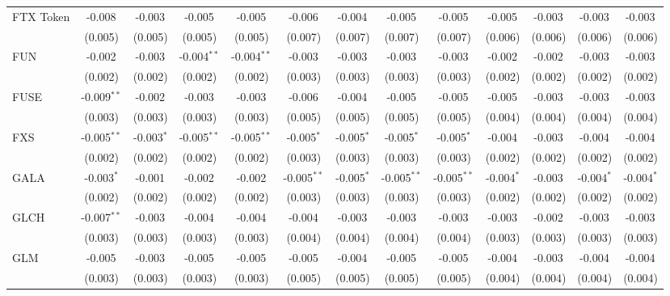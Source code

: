 \begin{table}[!htbp]
\begin{tabular}{@{\extracolsep{5pt}}lcccccccccccc}
 FTX Token & -0.008$^{}$ & -0.003$^{}$ & -0.005$^{}$ & -0.005$^{}$ & -0.006$^{}$ & -0.004$^{}$ & -0.005$^{}$ & -0.005$^{}$ & -0.005$^{}$ & -0.003$^{}$ & -0.003$^{}$ & -0.003$^{}$ \\
  & (0.005) & (0.005) & (0.005) & (0.005) & (0.007) & (0.007) & (0.007) & (0.007) & (0.006) & (0.006) & (0.006) & (0.006) \\
 FUN & -0.002$^{}$ & -0.003$^{}$ & -0.004$^{**}$ & -0.004$^{**}$ & -0.003$^{}$ & -0.003$^{}$ & -0.003$^{}$ & -0.003$^{}$ & -0.002$^{}$ & -0.002$^{}$ & -0.003$^{}$ & -0.003$^{}$ \\
  & (0.002) & (0.002) & (0.002) & (0.002) & (0.003) & (0.003) & (0.003) & (0.003) & (0.002) & (0.002) & (0.002) & (0.002) \\
 FUSE & -0.009$^{**}$ & -0.002$^{}$ & -0.003$^{}$ & -0.003$^{}$ & -0.006$^{}$ & -0.004$^{}$ & -0.005$^{}$ & -0.005$^{}$ & -0.005$^{}$ & -0.003$^{}$ & -0.003$^{}$ & -0.003$^{}$ \\
  & (0.003) & (0.003) & (0.003) & (0.003) & (0.005) & (0.005) & (0.005) & (0.005) & (0.004) & (0.004) & (0.004) & (0.004) \\
 FXS & -0.005$^{**}$ & -0.003$^{*}$ & -0.005$^{**}$ & -0.005$^{**}$ & -0.005$^{*}$ & -0.005$^{*}$ & -0.005$^{*}$ & -0.005$^{*}$ & -0.004$^{}$ & -0.003$^{}$ & -0.004$^{}$ & -0.004$^{}$ \\
  & (0.002) & (0.002) & (0.002) & (0.002) & (0.003) & (0.003) & (0.003) & (0.003) & (0.002) & (0.002) & (0.002) & (0.002) \\
 GALA & -0.003$^{*}$ & -0.001$^{}$ & -0.002$^{}$ & -0.002$^{}$ & -0.005$^{**}$ & -0.005$^{*}$ & -0.005$^{**}$ & -0.005$^{**}$ & -0.004$^{*}$ & -0.003$^{}$ & -0.004$^{*}$ & -0.004$^{*}$ \\
  & (0.002) & (0.002) & (0.002) & (0.002) & (0.003) & (0.003) & (0.003) & (0.003) & (0.002) & (0.002) & (0.002) & (0.002) \\
 GLCH & -0.007$^{**}$ & -0.003$^{}$ & -0.004$^{}$ & -0.004$^{}$ & -0.004$^{}$ & -0.003$^{}$ & -0.003$^{}$ & -0.003$^{}$ & -0.003$^{}$ & -0.002$^{}$ & -0.003$^{}$ & -0.003$^{}$ \\
  & (0.003) & (0.003) & (0.003) & (0.003) & (0.004) & (0.004) & (0.004) & (0.004) & (0.003) & (0.003) & (0.003) & (0.003) \\
 GLM & -0.005$^{}$ & -0.003$^{}$ & -0.005$^{}$ & -0.005$^{}$ & -0.005$^{}$ & -0.004$^{}$ & -0.005$^{}$ & -0.005$^{}$ & -0.004$^{}$ & -0.003$^{}$ & -0.004$^{}$ & -0.004$^{}$ \\
  & (0.003) & (0.003) & (0.003) & (0.003) & (0.005) & (0.005) & (0.005) & (0.005) & (0.004) & (0.004) & (0.004) & (0.004) \\

\end{tabular}
\end{table}
